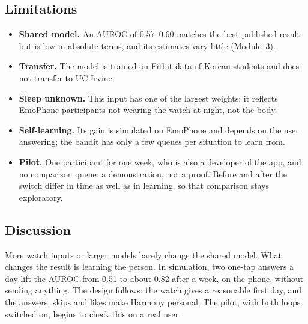 \documentclass[conference]{IEEEtran}
\begin{document}
\subsection{Limitations}
\begin{itemize}
\item \textbf{Shared model.} An AUROC of 0.57--0.60 matches the best published result but is low in absolute terms, and its estimates vary little (Module~3).
\item \textbf{Transfer.} The model is trained on Fitbit data of Korean students and does not transfer to UC Irvine.
\item \textbf{Sleep unknown.} This input has one of the largest weights; it reflects EmoPhone participants not wearing the watch at night, not the body.
\item \textbf{Self-learning.} Its gain is simulated on EmoPhone and depends on the user answering; the bandit has only a few queues per situation to learn from.
\item \textbf{Pilot.} One participant for one week, who is also a developer of the app, and no comparison queue: a demonstration, not a proof. Before and after the switch differ in time as well as in learning, so that comparison stays exploratory.
\end{itemize}

\subsection{Discussion}
More watch inputs or larger models barely change the shared model. What changes the result is learning the person. In simulation, two one-tap answers a day lift the AUROC from 0.51 to about 0.82 after a week, on the phone, without sending anything. The design follows: the watch gives a reasonable first day, and the answers, skips and likes make Harmony personal. The pilot, with both loops switched on, begins to check this on a real user.
\end{document}
